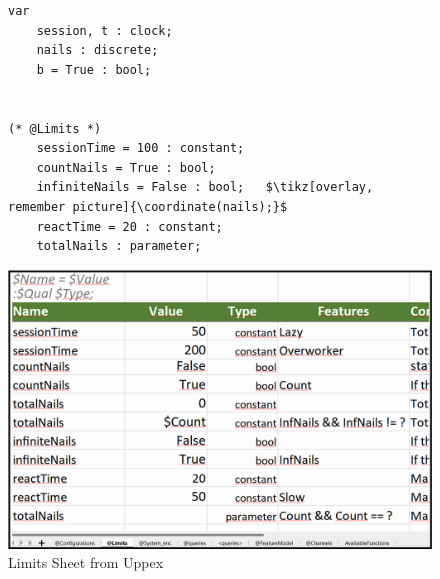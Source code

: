 
\begin{figure}[H]
    \centering
    \begin{lstlisting}[language=UPPAAL, caption={Example of Imitator syntax}, label={lst:imitator_example},mathescape=true]
var
    session, t : clock;
    nails : discrete;
    b = True : bool;


(* @Limits *)
    sessionTime = 100 : constant;
    countNails = True : bool;
    infiniteNails = False : bool;   $\tikz[overlay, remember picture]{\coordinate(nails);}$
    reactTime = 20 : constant;
    totalNails : parameter;
    \end{lstlisting}
\end{figure}


\begin{figure} [H]
    \centering
    \includegraphics[width=0.75\linewidth]{images/uppex_imi.png}
    \caption{Limits Sheet from Uppex }
    \label{fig:sheet}
\end{figure}

